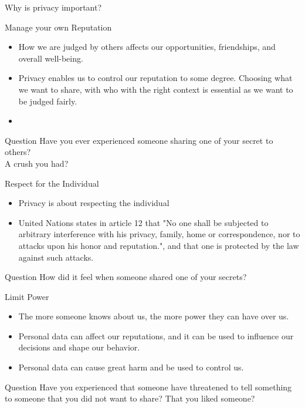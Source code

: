 \documentclass{beamer}
\begin{document}
\begin{frame}{Why is privacy important?}

\end{frame}


\begin{frame}{Manage your own Reputation}
\begin{itemize}
  \item How we are judged by others affects our opportunities, friendships, and overall well-being.
  \item Privacy enables us to control our reputation to some degree. Choosing what we want to share, with who with the right context is essential as we want to be judged fairly.
  \item
\end{itemize}
\begin{block}{Question}
Have you ever experienced someone sharing one of your secret to others? \\
A crush you had?
\end{block}
\end{frame}


\begin{frame}{Respect for the Individual}
\begin{itemize}
  \item Privacy is about respecting the individual
  \item United Nations states in article 12 that "No one shall be subjected to arbitrary interference with his privacy, family, home or correspondence, nor to attacks upon his honor and reputation.", and that one is protected by the law against such attacks.
\end{itemize}
\begin{block}{Question}
How did it feel when someone shared one of your secrets?
\end{block}
\end{frame}


\begin{frame}{Limit Power}
\begin{itemize}
  \item The more someone knows about us, the more power they can have over us.
  \item Personal data can affect our reputations, and it can be used to influence our decisions and shape our behavior.
  \item Personal data can cause great harm and be used to control us.
\end{itemize}
\begin{block}{Question}
Have you experienced that someone have threatened to tell something to someone that you did not want to share? That you liked someone?
\end{block}
\end{frame}
\end{document}
